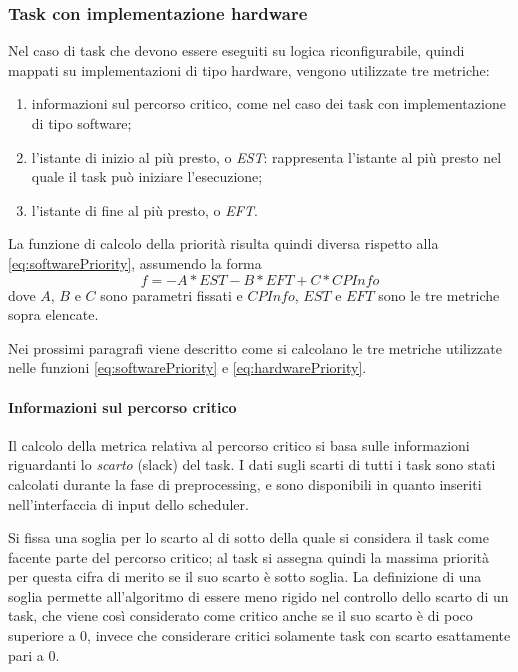 \subsubsection{Task con implementazione hardware}
Nel caso di task che devono essere eseguiti su logica riconfigurabile, quindi 
mappati su implementazioni di tipo hardware, vengono utilizzate tre metriche:
\begin{enumerate}
 \item informazioni sul percorso critico, come nel caso dei task con 
implementazione di tipo software;
 \item l'istante di inizio al più presto, o \emph{\ac{EST}}: rappresenta 
l'istante al più presto nel quale il task può iniziare l'esecuzione;
 \item l'istante di fine al più presto, o \emph{\ac{EFT}}.
\end{enumerate}
La funzione di calcolo della priorità risulta quindi diversa rispetto alla 
\ref{eq:softwarePriority}, assumendo la forma
\begin{equation} \label{eq:hardwarePriority}
 f=-A*EST - B*EFT + C*CPInfo
\end{equation}
dove $A$, $B$ e $C$ sono parametri fissati e $CPInfo$, $EST$ e $EFT$ sono le 
tre metriche sopra elencate.

Nei prossimi paragrafi viene descritto come si calcolano le tre metriche 
utilizzate nelle funzioni \ref{eq:softwarePriority} e \ref{eq:hardwarePriority}.

\paragraph{Informazioni sul percorso critico}
Il calcolo della metrica relativa al percorso critico si basa sulle 
informazioni riguardanti lo \emph{scarto} (slack) del task. I dati sugli 
scarti di tutti i task sono stati calcolati durante la fase di preprocessing, 
e sono disponibili in quanto inseriti nell'interfaccia di input dello scheduler.

Si fissa una soglia per lo scarto al di sotto della quale si considera il task 
come facente parte del percorso critico; al task si assegna quindi la massima 
priorità per questa cifra di merito se il suo scarto è sotto soglia. La 
definizione di una soglia permette all'algoritmo di essere meno rigido nel 
controllo dello scarto di un task, che viene così considerato come critico anche 
se il suo scarto è di poco superiore a $0$, invece che considerare critici 
solamente task con scarto esattamente pari a $0$.

